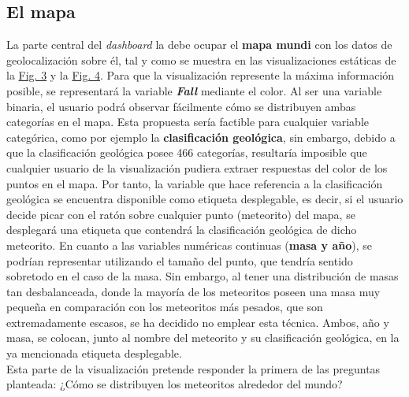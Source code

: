 \documentclass[12pt]{article}
\begin{document}
	\subsection{El mapa}
	La parte central del \textit{dashboard} la debe ocupar el \textbf{mapa mundi} con los datos de geolocalización sobre él, tal y como se muestra en las visualizaciones estáticas de la \hyperref[Fig:geolocation]{Fig. 3} y la \hyperref[Fig:geo_fall]{Fig. 4}. Para que la visualización represente la máxima información posible, se representará la variable \textbf{\textit{Fall}} mediante el color. Al ser una variable binaria, el usuario podrá observar fácilmente cómo se distribuyen ambas categorías en el mapa. Esta propuesta sería factible para cualquier variable categórica, como por ejemplo la \textbf{clasificación geológica}, sin embargo, debido a que la clasificación geológica posee 466 categorías, resultaría imposible que cualquier usuario de la visualización pudiera extraer respuestas del color de los puntos en el mapa. Por tanto, la variable que hace referencia a la clasificación geológica se encuentra disponible como etiqueta desplegable, es decir, si el usuario decide picar con el ratón sobre cualquier punto (meteorito) del mapa, se desplegará una etiqueta que contendrá la clasificación geológica de dicho meteorito. En cuanto a las variables numéricas continuas (\textbf{masa y año}), se podrían representar utilizando el tamaño del punto, que tendría sentido sobretodo en el caso de la masa. Sin embargo, al tener una distribución de masas tan desbalanceada, donde la mayoría de los meteoritos poseen una masa muy pequeña en comparación con los meteoritos más pesados, que son extremadamente escasos, se ha decidido no emplear esta técnica. Ambos, año y masa, se colocan, junto al nombre del meteorito y su clasificación geológica, en la ya mencionada etiqueta desplegable.\\
	Esta parte de la visualización pretende responder la primera de las preguntas planteada: ¿Cómo se distribuyen los meteoritos alrededor del mundo?
\end{document}
